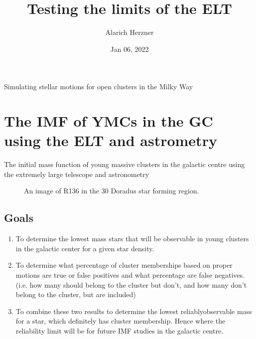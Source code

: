 \documentclass[letterpaper,10pt,english]{sphinxmanual}
\title{Testing the limits of the ELT}
\date{Jan 06, 2022}
\author{Alarich Herzner}
\begin{document}
\begin{figure}[htbp]
\centering
\capstart

\noindent{}

\end{figure}

\pagestyle{empty}
\sphinxmaketitle
\pagestyle{plain}
\sphinxtableofcontents
\pagestyle{normal}
\label{\detokenize{index::doc}}


\sphinxAtStartPar
Simulating stellar motions for open clusters in the Milky Way

\noindent{}


\chapter{The IMF of YMCs in the GC using the ELT and astrometry}
\label{\detokenize{Project_Overview/Aims:the-imf-of-ymcs-in-the-gc-using-the-elt-and-astrometry}}\label{\detokenize{Project_Overview/Aims::doc}}
\sphinxAtStartPar
The initial mass function of young massive clusters in the galactic centre
using the extremely large telescope and astronometry

\begin{figure}[htbp]
\centering
\capstart

\noindent{}
\caption{An image of R136 in the 30 Doradus star forming region.}\label{\detokenize{Project_Overview/Aims:id1}}\end{figure}


\section{Goals}
\label{\detokenize{Project_Overview/Aims:goals}}\begin{enumerate}
%
\item {} 
\sphinxAtStartPar
To determine the lowest mass stars that will be observable in young clusters
in the galactic center for a given star density.

\item {} 
\sphinxAtStartPar
To determine what percentage of cluster memberships based on proper motions
are true or false positives and what percentage are false negatives. (i.e.
how many should belong to the cluster but don’t, and how many don’t belong to
the cluster, but are included)

\item {} 
\sphinxAtStartPar
To combine these two results to determine the lowest reliably\sphinxhyphen{}observable mass
for a star, which definitely has cluster membership. Hence where the
reliability limit will be for future IMF studies in the galactic centre.

\end{enumerate}
\end{document}
